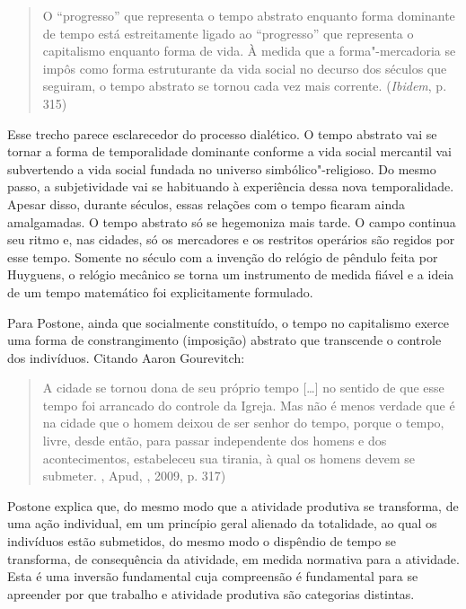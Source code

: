 \begin{quote}
O ``progresso'' que representa o tempo abstrato enquanto forma dominante
de tempo está estreitamente ligado ao ``progresso'' que representa o
capitalismo enquanto forma de vida. À medida que a forma"-mercadoria se
impôs como forma estruturante da vida social no decurso dos séculos que
seguiram, o tempo abstrato se tornou cada vez mais corrente.
(\emph{Ibidem}, p. 315)
\end{quote}

Esse trecho parece esclarecedor do processo dialético. O tempo abstrato
vai se tornar a forma de temporalidade dominante conforme a vida social
mercantil vai subvertendo a vida social fundada no universo
simbólico"-religioso. Do mesmo passo, a subjetividade vai se habituando à
experiência dessa nova temporalidade. Apesar disso, durante séculos,
essas relações com o tempo ficaram ainda amalgamadas. O tempo abstrato
só se hegemoniza mais tarde. O campo continua seu ritmo e, nas cidades,
só os mercadores e os restritos operários são regidos por esse tempo.
Somente no século  com a invenção do relógio de pêndulo feita por
Huyguens, o relógio mecânico se torna um instrumento de medida fiável e
a ideia de um tempo matemático foi explicitamente formulado.

Para Postone, ainda que socialmente constituído, o tempo no capitalismo
exerce uma forma de constrangimento (imposição) abstrato que transcende
o controle dos indivíduos. Citando Aaron Gourevitch:

\begin{quote}
A cidade se tornou dona de seu próprio tempo [\ldots{}] no sentido de que
esse tempo foi arrancado do controle da Igreja. Mas não é menos verdade
que é na cidade que o homem deixou de ser senhor do tempo, porque o
tempo, livre, desde então, para passar independente dos homens e dos
acontecimentos, estabeleceu sua tirania, à qual os homens devem se
submeter. , Apud, , 2009, p. 317)
\end{quote}

Postone explica que, do mesmo modo que a atividade produtiva se
transforma, de uma ação individual, em um princípio geral alienado da
totalidade, ao qual os indivíduos estão submetidos, do mesmo modo o
dispêndio de tempo se transforma, de consequência da atividade, em
medida normativa para a atividade. Esta é uma inversão fundamental
cuja compreensão é fundamental para se apreender por que trabalho
e atividade produtiva são categorias distintas.


